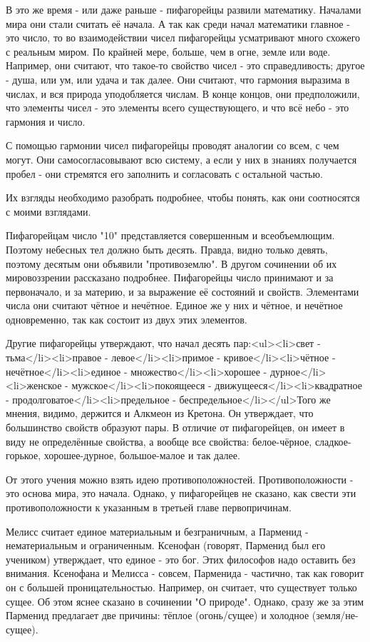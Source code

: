 \documentclass{article}
\begin{document}
В это же время
\footnotemark[1]
- или даже раньше - пифагорейцы развили математику. Началами мира они стали считать её начала. А так как среди начал математики главное - это число, то во взаимодействии чисел пифагорейцы усматривают много схожего с реальным миром. По крайней мере, больше, чем в огне, земле или воде. Например, они считают, что такое-то свойство чисел - это справедливость; другое - душа, или ум, или удача и так далее. Они считают, что гармония выразима в числах, и вся природа уподобляется числам. В конце концов, они предположили, что элементы чисел - это элементы всего существующего, и что всё небо - это гармония и число.
\footnotemark[2]


С помощью гармонии чисел пифагорейцы проводят аналогии со всем, с чем могут. Они самосогласовывают всю систему, а если у них в знаниях получается пробел - они стремятся его заполнить и согласовать с остальной частью.

Их взгляды необходимо разобрать подробнее, чтобы понять, как они соотносятся с моими взглядами.

Пифагорейцам число "10" представляется совершенным и всеобъемлющим. Поэтому небесных тел должно быть десять. Правда, видно только девять, поэтому десятым они объявили "противоземлю". В другом сочинении об их мировоззрении рассказано подробнее. Пифагорейцы число принимают и за первоначало, и за материю, и за выражение её состояний и свойств. Элементами числа они считают чётное и нечётное. Единое
\footnotemark[3]
же у них и чётное, и нечётное одновременно, так как состоит из двух этих элементов.

Другие пифагорейцы утверждают, что начал десять пар:<ul><li>свет - тьма</li><li>правое - левое</li><li>примое - кривое</li><li>чётное - нечётное</li><li>единое - множество</li><li>хорошее - дурное</li><li>женское - мужское</li><li>покоящееся - движущееся</li><li>квадратное - продолговатое</li><li>предельное - беспредельное</li></ul>Того же мнения, видимо, держится и Алкмеон из Кретона. Он утверждает, что большинство свойств образуют пары. В отличие от пифагорейцев, он имеет в виду не определённые свойства, а вообще все свойства: белое-чёрное, сладкое-горькое, хорошее-дурное, большое-малое и так далее.

От этого учения можно взять идею противоположностей. Противоположности - это основа мира, это начала. Однако, у пифагорейцев не сказано, как свести эти противоположности к указанным в третьей главе первопричинам.

Мелисс считает единое
\footnotemark[3]
материальным и безграничным, а Парменид - нематериальным и ограниченным. Ксенофан (говорят, Парменид был его учеником) утверждает, что единое - это бог. Этих философов надо оставить без внимания. Ксенофана и Мелисса - совсем, Парменида - частично, так как говорит он с большей проницательностью. Например, он считает, что существует только сущее. Об этом яснее сказано в сочинении "О природе". Однако, сразу же за этим Парменид предлагает две причины: тёплое (огонь/сущее) и холодное (земля/не-сущее).
\end{document}
